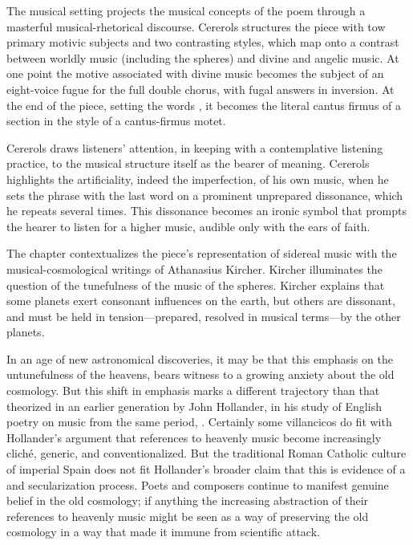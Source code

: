 \documentclass{vcbook-proposal}
\begin{document}
The musical setting projects the musical concepts of the poem through a masterful musical-rhetorical discourse.
Cererols structures the piece with tow primary motivic subjects and two contrasting styles, which map onto a contrast between worldly music (including the spheres) and divine and angelic music. 
At one point the motive associated with divine music becomes the subject of an eight-voice fugue for the full double chorus, with fugal answers in inversion.
At the end of the piece, setting the words , it becomes the literal cantus firmus of a section in the style of a cantus-firmus motet.

Cererols draws listeners' attention, in keeping with a contemplative listening practice, to the musical structure itself as the bearer of meaning.
Cererols highlights the artificiality, indeed the imperfection, of his own music, when he sets the phrase  with the last word on a prominent unprepared dissonance, which he repeats several times.
This dissonance becomes an ironic symbol that prompts the hearer to listen for a higher music, audible only with the ears of faith.

The chapter contextualizes the piece's representation of sidereal music with the musical-cosmological writings of Athanasius Kircher.
Kircher illuminates the question of the tunefulness of the music of the spheres.
Kircher explains that some planets exert consonant influences on the earth, but others are dissonant, and must be held in tension---prepared, resolved in musical terms---by the other planets. 

In an age of new astronomical discoveries, it may be that this emphasis on the untunefulness of the heavens, bears witness to a growing anxiety about the old cosmology.
But this shift in emphasis marks a different trajectory than that theorized in an earlier generation by John Hollander, in his study of English poetry on music from the same period, .
Certainly some villancicos do fit with Hollander's argument that references to heavenly music become increasingly cliché, generic, and conventionalized.
But the traditional Roman Catholic culture of imperial Spain does not fit Hollander's broader claim that this is evidence of a  and secularization process.
Poets and composers continue to manifest genuine belief in the old cosmology; if anything the increasing abstraction of their references to heavenly music might be seen as a way of preserving the old cosmology in a way that made it immune from scientific attack.
\end{document}
